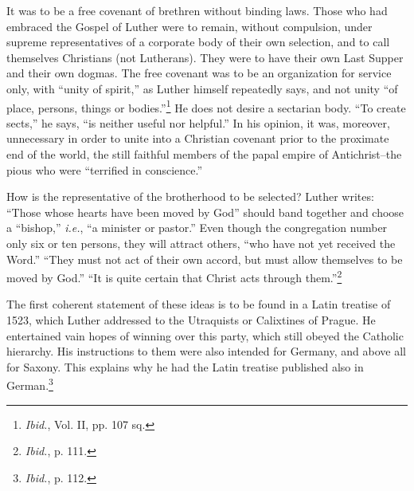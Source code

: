It was to be a free covenant of brethren without binding
laws. Those who had embraced the Gospel of Luther were to remain,
without compulsion, under supreme representatives of a corporate body of
their own selection, and to call themselves Christians (not Lutherans). They
were to have their own Last Supper and their own dogmas. The
free covenant was to be an
organization for service only, with “unity of spirit,”
as Luther himself
repeatedly says, and not unity “of place, persons,
things or bodies.”\footnote{\textit{Ibid.}, Vol. II, pp. 107 sq.}
He does not desire a sectarian body. “To create sects,”
he says, “is neither useful nor helpful.” In his opinion, it was, moreover, unnecessary
in order to unite into a Christian covenant prior to the proximate end of the world, the still
faithful members of the papal empire of Antichrist--the pious who were
“terrified in conscience.”

How is the representative of the brotherhood to be selected? Luther
writes: “Those whose hearts have been moved by God” should band together
and choose a “bishop,” \textit{i.e.}, “a minister or pastor.” Even though the congregation
number only six or ten persons, they will attract others, “who
have not yet received the Word.” “They must not act of their own accord,
but must allow themselves to be moved by God.” “It is quite certain that
Christ acts through them.”\footnote{\textit{Ibid.}, p. 111.}

The first coherent statement of these ideas is to be found in a Latin
treatise of 1523, which Luther addressed to the Utraquists or Calixtines of
Prague. He entertained vain hopes of winning over this party, which still
obeyed the Catholic hierarchy. His instructions to them were also intended
for Germany, and above all for Saxony. This explains why he had the Latin
treatise published also in German.\footnote{\textit{Ibid.}, p. 112.}

